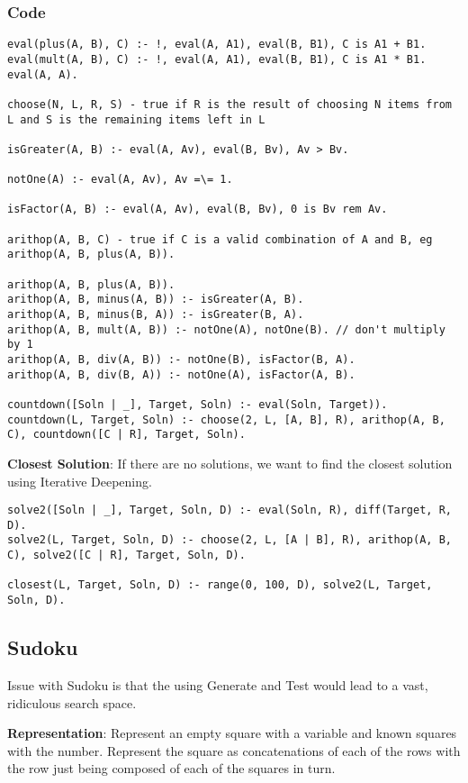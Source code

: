 \documentclass{article}
\begin{document}
\subsubsection{Code}
\begin{lstlisting}[frame=single]
eval(plus(A, B), C) :- !, eval(A, A1), eval(B, B1), C is A1 + B1.
eval(mult(A, B), C) :- !, eval(A, A1), eval(B, B1), C is A1 * B1.
eval(A, A).

choose(N, L, R, S) - true if R is the result of choosing N items from L and S is the remaining items left in L

isGreater(A, B) :- eval(A, Av), eval(B, Bv), Av > Bv.

notOne(A) :- eval(A, Av), Av =\= 1.

isFactor(A, B) :- eval(A, Av), eval(B, Bv), 0 is Bv rem Av.

arithop(A, B, C) - true if C is a valid combination of A and B, eg arithop(A, B, plus(A, B)).

arithop(A, B, plus(A, B)).
arithop(A, B, minus(A, B)) :- isGreater(A, B).
arithop(A, B, minus(B, A)) :- isGreater(B, A).
arithop(A, B, mult(A, B)) :- notOne(A), notOne(B). // don't multiply by 1
arithop(A, B, div(A, B)) :- notOne(B), isFactor(B, A).
arithop(A, B, div(B, A)) :- notOne(A), isFactor(A, B).

countdown([Soln | _], Target, Soln) :- eval(Soln, Target)).
countdown(L, Target, Soln) :- choose(2, L, [A, B], R), arithop(A, B, C), countdown([C | R], Target, Soln).
\end{lstlisting}

\bigskip
\noindent
\textbf{Closest Solution}: If there are no solutions, we want to find the closest solution using Iterative Deepening.\\
\begin{lstlisting}[frame=single]
solve2([Soln | _], Target, Soln, D) :- eval(Soln, R), diff(Target, R, D).
solve2(L, Target, Soln, D) :- choose(2, L, [A | B], R), arithop(A, B, C), solve2([C | R], Target, Soln, D).

closest(L, Target, Soln, D) :- range(0, 100, D), solve2(L, Target, Soln, D).
\end{lstlisting}

\bigskip
\subsection{Sudoku}
Issue with Sudoku is that the using Generate and Test would lead to a vast, ridiculous search space.

\textbf{Representation}: Represent an empty square with a variable and known squares with the number. Represent the square as concatenations of each of the rows with the row just being composed of each of the squares in turn.
\end{document}
